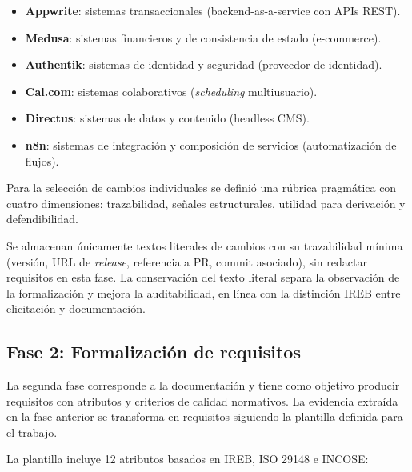 \begin{itemize}
    \item \textbf{Appwrite}: sistemas transaccionales (backend-as-a-service con APIs REST).
    \item \textbf{Medusa}: sistemas financieros y de consistencia de estado (e-commerce).
    \item \textbf{Authentik}: sistemas de identidad y seguridad (proveedor de identidad).
    \item \textbf{Cal.com}: sistemas colaborativos (\emph{scheduling} multiusuario).
    \item \textbf{Directus}: sistemas de datos y contenido (headless CMS).
    \item \textbf{n8n}: sistemas de integraci\'on y composici\'on de servicios (automatizaci\'on de flujos).
\end{itemize}

Para la selecci\'on de cambios individuales se defini\'o una r\'ubrica pragm\'atica con cuatro dimensiones: trazabilidad, se\~nales estructurales, utilidad para derivaci\'on y defendibilidad.

Se almacenan \'unicamente textos literales de cambios con su trazabilidad m\'inima (versi\'on, URL de \emph{release}, referencia a PR, commit asociado), sin redactar requisitos en esta fase. La conservaci\'on del texto literal separa la observaci\'on de la formalizaci\'on y mejora la auditabilidad, en l\'inea con la distinci\'on IREB entre elicitaci\'on y documentaci\'on.

\subsection{Fase 2: Formalizaci\'on de requisitos}

La segunda fase corresponde a la documentaci\'on y tiene como objetivo producir requisitos con atributos y criterios de calidad normativos. La evidencia extra\'ida en la fase anterior se transforma en requisitos siguiendo la plantilla definida para el trabajo.

La plantilla incluye 12 atributos basados en IREB, ISO 29148 e INCOSE:

